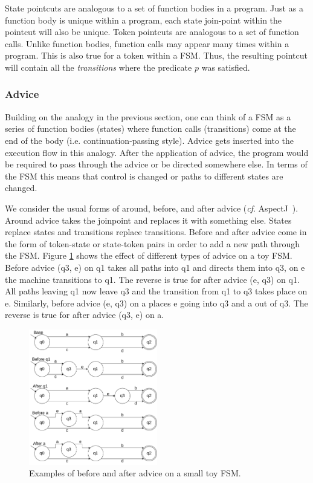 \documentclass[conference]{IEEEtran}
\begin{document}
State pointcuts are analogous to a set of function bodies in a program. Just as a function body is unique within a program, each state join-point within the pointcut will also be unique. Token pointcuts are analogous to a set of function calls. Unlike function bodies, function calls may appear many times within a program. This is also true for a token within a FSM. Thus, the resulting pointcut will contain all the \emph{transitions} where the predicate $p$ was satisfied. 

\subsubsection{Advice}
Building on the analogy in the previous section, one can think of a FSM as a series of function bodies (states) where function calls (transitions) come at the end of the body (i.e. continuation-passing style). Advice gets inserted into the execution flow in this analogy. After the application of advice, the program would be required to pass through the advice or be directed somewhere else. In terms of the FSM this means that control is changed or paths to different states are changed.

We consider the usual forms of around, before, and after advice (\emph{cf}. AspectJ~\cite{AspectJ:01}). Around advice takes the joinpoint and replaces it with something else. States replace states and transitions replace transitions. Before and after advice come in the form of token-state or state-token pairs in order to add a new path through the FSM. Figure \ref{fig:adviceExamples} shows the effect of different types of advice on a toy FSM. Before advice (q3, e) on q1 takes all paths into q1 and directs them into q3, on e the machine transitions to q1. The reverse is true for after advice (e, q3) on q1. All paths leaving q1 now leave q3 and the transition from q1 to q3 takes place on e. Similarly, before advice (e, q3) on a places e going into q3 and a out of q3. The reverse is true for after advice (q3, e) on a.

\begin{figure}[ht]
    \centering
    \includegraphics[width=0.5\textwidth]{isca2023-latex-template/figures/AdviceExamples.drawio.pdf}
    \caption{Examples of before and after advice on a small toy FSM.}
    \label{fig:adviceExamples}
\end{figure}
\end{document}
